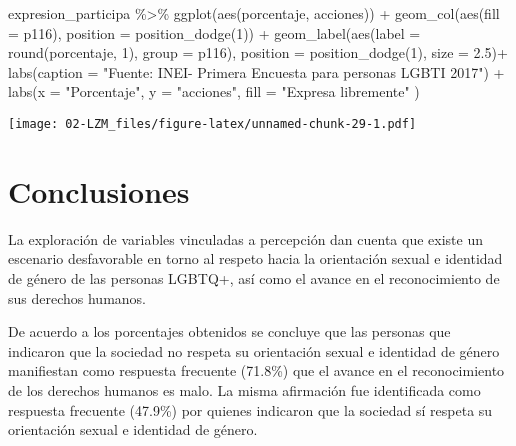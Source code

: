 \documentclass[
]{book}
\newenvironment{Shaded}{\begin{snugshade}}{\end{snugshade}}
\newcommand{\AttributeTok}[1]{\textcolor[rgb]{0.77,0.63,0.00}{#1}}
\newcommand{\DecValTok}[1]{\textcolor[rgb]{0.00,0.00,0.81}{#1}}
\newcommand{\FloatTok}[1]{\textcolor[rgb]{0.00,0.00,0.81}{#1}}
\newcommand{\FunctionTok}[1]{\textcolor[rgb]{0.00,0.00,0.00}{#1}}
\newcommand{\NormalTok}[1]{#1}
\newcommand{\SpecialCharTok}[1]{\textcolor[rgb]{0.00,0.00,0.00}{#1}}
\newcommand{\StringTok}[1]{\textcolor[rgb]{0.31,0.60,0.02}{#1}}
\theoremstyle{definition}
\theoremstyle{definition}
\theoremstyle{definition}
\theoremstyle{definition}
\theoremstyle{remark}
\begin{document}
\begin{Shaded}
\begin{Highlighting}[]
\NormalTok{expresion\_participa }\SpecialCharTok{\%\textgreater{}\%}
  \FunctionTok{ggplot}\NormalTok{(}\FunctionTok{aes}\NormalTok{(porcentaje, acciones)) }\SpecialCharTok{+}
  \FunctionTok{geom\_col}\NormalTok{(}\FunctionTok{aes}\NormalTok{(}\AttributeTok{fill =}\NormalTok{ p116), }\AttributeTok{position =} \FunctionTok{position\_dodge}\NormalTok{(}\DecValTok{1}\NormalTok{)) }\SpecialCharTok{+}
  \FunctionTok{geom\_label}\NormalTok{(}\FunctionTok{aes}\NormalTok{(}\AttributeTok{label =} \FunctionTok{round}\NormalTok{(porcentaje, }\DecValTok{1}\NormalTok{), }\AttributeTok{group =}\NormalTok{ p116), }
             \AttributeTok{position =} \FunctionTok{position\_dodge}\NormalTok{(}\DecValTok{1}\NormalTok{), }\AttributeTok{size =} \FloatTok{2.5}\NormalTok{)}\SpecialCharTok{+}
  \FunctionTok{labs}\NormalTok{(}\AttributeTok{caption =} \StringTok{"Fuente: INEI{-} Primera Encuesta para personas LGBTI 2017"}\NormalTok{) }\SpecialCharTok{+}
  \FunctionTok{labs}\NormalTok{(}\AttributeTok{x =} \StringTok{"Porcentaje"}\NormalTok{,}
       \AttributeTok{y =} \StringTok{"acciones"}\NormalTok{,}
       \AttributeTok{fill =} \StringTok{"Expresa libremente"}
\NormalTok{       )}
\end{Highlighting}
\end{Shaded}

\texttt{[image: 02-LZM\_files/figure-latex/unnamed-chunk-29-1.pdf]}

\hypertarget{conclusiones}{%
\section{Conclusiones}\label{conclusiones}}

La exploración de variables vinculadas a percepción dan cuenta que existe un escenario desfavorable en torno al respeto hacia la orientación sexual e identidad de género de las personas LGBTQ+, así como el avance en el reconocimiento de sus derechos humanos.

De acuerdo a los porcentajes obtenidos se concluye que las personas que indicaron que la sociedad no respeta su orientación sexual e identidad de género manifiestan como respuesta frecuente (71.8\%) que el avance en el reconocimiento de los derechos humanos es malo. La misma afirmación fue identificada como respuesta frecuente (47.9\%) por quienes indicaron que la sociedad sí respeta su orientación sexual e identidad de género.
\end{document}
